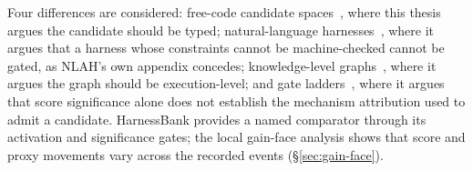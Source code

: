 Four differences are considered: free-code
candidate spaces~\cite{adas,dgm}, where this thesis argues the candidate
should be typed; natural-language harnesses~\cite{nlah}, where it argues
that a harness whose constraints cannot be machine-checked cannot be
gated, as NLAH's own appendix concedes; knowledge-level
graphs~\cite{mega}, where it argues the graph should be execution-level;
and gate ladders~\cite{alphaevolve,harnessbank}, where it argues that
score significance alone does not establish the mechanism attribution used
to admit a candidate. HarnessBank provides a named comparator through its
activation and significance gates;
the local gain-face analysis shows that score and proxy movements vary
across the recorded events (\S\ref{sec:gain-face}).


